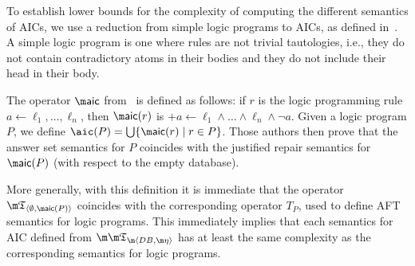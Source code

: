 
To establish lower bounds for the complexity of computing the different semantics of AICs, we use a reduction from simple logic programs to AICs, as defined in~\cite{tplp/CaropreseT11}.
A simple logic program is one where rules are not trivial tautologies, i.e., they do not contain contradictory atoms in their bodies and they do not include their head in their body.

The operator $\aicop$ from~\cite{tplp/CaropreseT11} is defined as follows: if $r$ is the logic programming rule $a\leftarrow \ell_1,\ldots,\ell_n$, then $\aicop(r)$ is ${+a}\leftarrow \ell_1\wedge\ldots\wedge\ell_n\wedge\neg a$.
Given a logic program $P$, we define $\aic(P)=\bigcup\{\aicop(r)\mid r\in P\}$.
Those authors then prove that the answer set semantics for $P$ coincides with the justified repair semantics for $\aicop(P)$ (with respect to the empty database).

More generally, with this definition it is immediate that the operator $\threeap_{\langle\emptyset,\aicop(P)\rangle}$ coincides with the corresponding operator $T_P$, used to define AFT semantics for logic programs.
This immediately implies that each semantics for AIC defined from $\Apfull$ has at least the same complexity as the corresponding semantics for logic programs.


